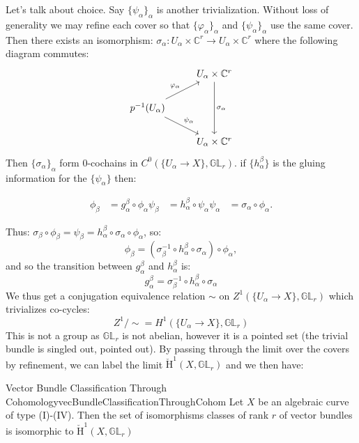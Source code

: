\documentclass{book}
\newcommand{\C}{{\mathbb{C}}}
\newcommand{\BGL}{{\mathbb{GL}}}
\newcommand\cH{\check{\mathrm{H}}}
\let\temp\phi
\let\phi\varphi
\let\varphi\temp
\begin{document}
Let's talk about choice. Say $\{\psi_\alpha\}_\alpha$ is another trivialization. Without loss of generality we
may refine each cover so that $\{\phi_\alpha\}_\alpha$ and $\{\psi_\alpha\}_\alpha$ use the same cover. Then
there exists an isomorphism: $\sigma_\alpha: U_\alpha\times \C^r \to U_\alpha\times \C^r$ where the following
diagram commutes:
\[
  \begin{tikzcd}
                                                                     & U_\alpha\times \C^r \arrow[dd, "\sigma_\alpha"] \\
p^{-1}(U_\alpha) \arrow[ru, "\phi_\alpha"] \arrow[rd, "\psi_\alpha"] &                                                 \\
                                                                     & U_\alpha\times \C^r
\end{tikzcd}
\]
Then $\{\sigma_\alpha\}_\alpha$ form $0$-cochains in $C^0(\{U_\alpha \to X\}, \BGL_r)$. if
$\{h_\alpha^\beta\}$ is the gluing information for the $\{\psi_\alpha\}$ then:

\begin{align*}
  \varphi_\beta &= g_\alpha^\beta \circ \varphi_\alpha
  \psi_\beta &= h_\alpha^\beta \circ \psi_\alpha
  \psi_\alpha &= \sigma_\alpha \circ \varphi_\alpha.
\end{align*}

Thus: $\sigma_\beta \circ \varphi_\beta = \psi_\beta = h_\alpha^\beta \circ \sigma_\alpha \circ
\varphi_\alpha$, so:
\[
    \varphi_\beta = (\sigma_\beta^{-1} \circ h_\alpha^\beta \circ \sigma_\alpha) \circ \varphi_\alpha,
\]
and so the transition between $g_\alpha^\beta$ and $h_\alpha^\beta$ is:
\[
  g_\alpha^\beta = \sigma_\beta^{-1} \circ h_\alpha^\beta \circ \sigma_\alpha
\]
We thus get a conjugation equivalence relation $\sim$ on $Z^1(\{U_\alpha \to X\}, \BGL_r)$ which trivializes
co-cycles:
\[
  Z^1/\sim = H^1(\{U_\alpha \to X\}, \BGL_r)
\]
This is not a group as $\BGL_r$ is not abelian, however it is a pointed set (the trivial bundle is singled
out, pointed out). By passing through the limit over the covers by refinement, we can label the limit
$\cH^1(X, \BGL_r)$ and we then have:

\begin{thm}{Vector Bundle Classification Through Cohomology}{vecBundleClassificationThroughCohom}
    Let $X$ be an algebraic curve of type (I)-(IV). Then the set of isomorphisms classes of rank $r$ of vector
    bundles is isomorphic to $\cH^1(X, \BGL_r)$
\end{thm}
\end{document}
